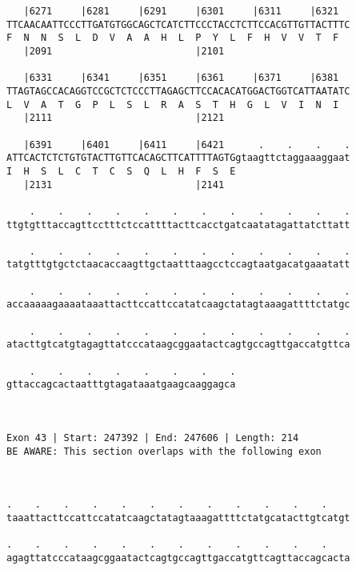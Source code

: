 \documentclass{article}
\begin{document}
\begin{Verbatim}
   |6271     |6281     |6291     |6301     |6311     |6321  
TTCAACAATTCCCTTGATGTGGCAGCTCATCTTCCCTACCTCTTCCACGTTGTTACTTTC
F  N  N  S  L  D  V  A  A  H  L  P  Y  L  F  H  V  V  T  F  
   |2091                         |2101                      
  
   |6331     |6341     |6351     |6361     |6371     |6381  
TTAGTAGCCACAGGTCCGCTCTCCCTTAGAGCTTCCACACATGGACTGGTCATTAATATC
L  V  A  T  G  P  L  S  L  R  A  S  T  H  G  L  V  I  N  I  
   |2111                         |2121                      
  
   |6391     |6401     |6411     |6421      .    .    .    .
ATTCACTCTCTGTGTACTTGTTCACAGCTTCATTTTAGTGgtaagttctaggaaaggaat
I  H  S  L  C  T  C  S  Q  L  H  F  S  E                    
   |2131                         |2141                      
  
    .    .    .    .    .    .    .    .    .    .    .    .
ttgtgtttaccagttcctttctccattttacttcacctgatcaatatagattatcttatt
                                                            
    .    .    .    .    .    .    .    .    .    .    .    .
tatgtttgtgctctaacaccaagttgctaatttaagcctccagtaatgacatgaaatatt
                                                            
    .    .    .    .    .    .    .    .    .    .    .    .
accaaaaagaaaataaattacttccattccatatcaagctatagtaaagattttctatgc
                                                            
    .    .    .    .    .    .    .    .    .    .    .    .
atacttgtcatgtagagttatcccataagcggaatactcagtgccagttgaccatgttca
                                                            
    .    .    .    .    .    .    .    .
gttaccagcactaatttgtagataaatgaagcaaggagca
                                        
                                        
 
Exon 43 | Start: 247392 | End: 247606 | Length: 214
BE AWARE: This section overlaps with the following exon



.    .    .    .    .    .    .    .    .    .    .    .    
taaattacttccattccatatcaagctatagtaaagattttctatgcatacttgtcatgt
                                                            
.    .    .    .    .    .    .    .    .    .    .    .    
agagttatcccataagcggaatactcagtgccagttgaccatgttcagttaccagcacta
                                                            

\end{Verbatim}
\end{document}

